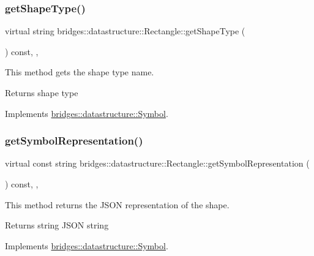 \subsubsection{\texorpdfstring{get\+Shape\+Type()}{getShapeType()}}
{\footnotesize\ttfamily virtual string bridges\+::datastructure\+::\+Rectangle\+::get\+Shape\+Type (\begin{DoxyParamCaption}{ }\end{DoxyParamCaption}) const\hspace{0.3cm}{\ttfamily [inline]}, {\ttfamily [override]}, {\ttfamily [virtual]}}



This method gets the shape type name. 

\begin{DoxyReturn}{Returns}
shape type 
\end{DoxyReturn}


Implements \hyperlink{classbridges_1_1datastructure_1_1_symbol_a1fb7cabce2915b103b8474658e8549f8}{bridges\+::datastructure\+::\+Symbol}.

\mbox{\label{classbridges_1_1datastructure_1_1_rectangle_a13fa4e45a78fdc7c49bfe566cb809ab3}} 
\subsubsection{\texorpdfstring{get\+Symbol\+Representation()}{getSymbolRepresentation()}}
{\footnotesize\ttfamily virtual const string bridges\+::datastructure\+::\+Rectangle\+::get\+Symbol\+Representation (\begin{DoxyParamCaption}{ }\end{DoxyParamCaption}) const\hspace{0.3cm}{\ttfamily [inline]}, {\ttfamily [override]}, {\ttfamily [virtual]}}



This method returns the J\+S\+ON representation of the shape. 

\begin{DoxyReturn}{Returns}
string J\+S\+ON string 
\end{DoxyReturn}


Implements \hyperlink{classbridges_1_1datastructure_1_1_symbol_a8044b3da559dcd9de8510ae339f126c8}{bridges\+::datastructure\+::\+Symbol}.

